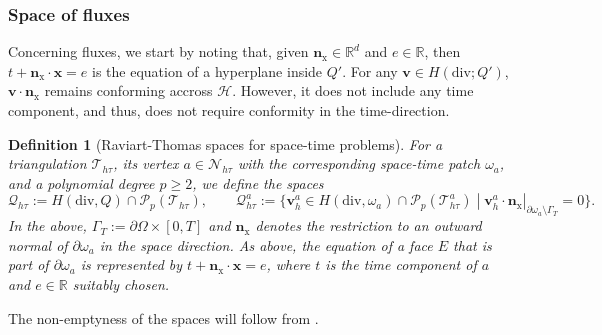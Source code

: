 \documentclass[review,11pt]{article}
\numberwithin{equation}{section}
\def \oma {\omega_a}
\def \Om {\Omega}
\def \p  {\partial}
\def \R  {{\mathbb{R}}}
\def \x {{\bm{x}}}
\def \htt {{h\tau}}
\def \calN {\mathcal{N}}
\def \calP {\mathcal{P}}
\def \calQ {\bm{\mathcal{Q}}}
\def \calT {\mathcal{T}}
\def \nhat {\bm{n}_{\mathrm{x}}}
\newtheorem{definition}[definition]{Definition}
\begin{document}
\subsubsection{Space of fluxes}
Concerning fluxes, we start by noting that, given $\nhat\in \R^d$ and $e\in\mathbb{R}$, then $t+\nhat\cdot \bm{x}=e$ is the equation of a hyperplane inside $Q'$. For any $\bm{v}\in H(\mathrm{div};Q')$, $\bm{v}\cdot \nhat$ remains conforming accross $\mathcal{H}$. However, it does not include any time component, and thus, does not require conformity in the time-direction.

\begin{definition}[Raviart-Thomas spaces for space-time problems]\label{def:Qhtspace}
For a triangulation $\calT_\htt$, its vertex $a\in \calN_\htt$ with the corresponding space-time patch $\omega_a$, and a polynomial degree $p\geq 2$, we define the spaces
\[
\calQ_\htt:= H(\mathrm{div},Q)\cap \calP_p(\calT_\htt),\qquad  \calQ^a_\htt:=\{\boldsymbol{v}^a_h \in H(\mathrm{div},\oma)\cap \calP_p(\calT_\htt^a) \;|\; \bm{v}^a_h\cdot \nhat|_{\p\oma \setminus \Gamma_T}=0 \}.
\]
In the above, $\Gamma_T:=\p \Om \times [0,T]$ and $\nhat$ denotes the restriction to an outward normal of $\p\oma$ in the space direction. As above, the equation of a face $E$ that is part of $\p\oma$ is represented by $t+ \nhat\cdot \x=e$, where $t$ is the time component of $a$ and $e\in \mathbb{R}$ suitably chosen.
\end{definition}

The non-emptyness of the spaces will follow from .
\end{document}
